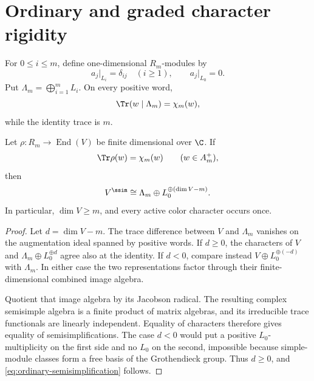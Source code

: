 \section{Ordinary and graded character rigidity}
\label{sec:character}

For \(0\le i\le m\), define one-dimensional \(R_m\)-modules by
\begin{equation}
 a_j\big|_{L_i}=\delta_{ij}\quad(i\ge1),
 \qquad
 a_j\big|_{L_0}=0.
 \label{eq:color-characters}
\end{equation}
Put \(\Lambda_m=\bigoplus_{i=1}^mL_i\).  On every positive word,
\begin{equation}
 \Tr(w\mid\Lambda_m)=\chi_m(w),
 \label{eq:target-character}
\end{equation}
while the identity trace is \(m\).

\begin{theorem}
\label{thm:ordinary-rigidity}
Let \(\rho:R_m\to\operatorname{End}(V)\) be finite dimensional over \(\C\).
If
\begin{equation}
 \Tr\rho(w)=\chi_m(w)\qquad(w\in A_m^+),
 \label{eq:ordinary-word-hypothesis}
\end{equation}
then
\begin{equation}
 V^{\ssim}\cong
 \Lambda_m\oplus L_0^{\oplus(\dim V-m)}.
 \label{eq:ordinary-semisimplification}
\end{equation}
In particular, \(\dim V\ge m\), and every active color character occurs once.
\end{theorem}

\begin{proof}
Let \(d=\dim V-m\).  The trace difference between \(V\) and \(\Lambda_m\)
vanishes on the augmentation ideal spanned by positive words.  If \(d\ge0\),
the characters of \(V\) and \(\Lambda_m\oplus L_0^{\oplus d}\) agree also at
the identity.  If \(d<0\), compare instead
\(V\oplus L_0^{\oplus(-d)}\) with \(\Lambda_m\).  In either case the two
representations factor through their finite-dimensional combined image
algebra.

Quotient that image algebra by its Jacobson radical.  The resulting complex
semisimple algebra is a finite product of matrix algebras, and its irreducible
trace functionals are linearly independent.  Equality of characters therefore
gives equality of semisimplifications.  The case \(d<0\) would put a positive
\(L_0\)-multiplicity on the first side and no \(L_0\) on the second, impossible
because simple-module classes form a free basis of the Grothendieck group.
Thus \(d\ge0\), and \eqref{eq:ordinary-semisimplification} follows.
\end{proof}

